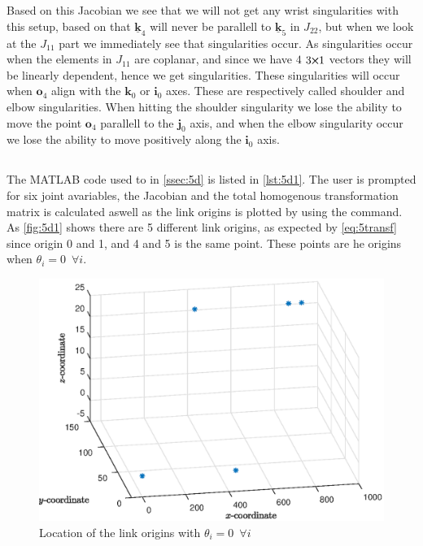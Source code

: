 \documentclass[a4paper]{scrartcl}
\begin{document}
Based on this Jacobian we see that we will not get any wrist singularities with this setup, based on that $\underline{\bm{k}}_4$ will never be parallell to $\underline{\bm{k}}_5$ in $J_{22}$, but when we look at the $J_{11}$ part we immediately see that singularities occur. As singularities occur when the elements in $J_{11}$ are coplanar, and since we have $4$ $3\!\!\cross\!\!1$ vectors they will be linearly dependent, hence we get singularities. These singularities will occur when $\bm{o}_4$ align with the $\bm{k}_0$ or $\bm{i}_0$ axes. These are respectively called shoulder and elbow singularities. When hitting the shoulder singularity we lose the ability to move the point $\bm{o}_4$ parallell to the $\bm{j}_0$ axis, and when the elbow singularity occur we lose the ability to move positively along the $\bm{i}_0$ axis.


\subsection{}\label{ssec:5d} %
The MATLAB code used to in \autoref{ssec:5d} is listed in \autoref{lst:5d1}. The user is prompted for six joint avariables, the Jacobian and the total homogenous transformation matrix is calculated aswell as the link origins is plotted by using the  command. As \autoref{fig:5d1} shows there are 5 different link origins, as expected by \eqref{eq:5transf} since origin 0 and 1, and 4 and 5 is the same point. These points are he origins when $\theta_i = 0 \enspace \forall i$.

\begin{figure}[ht!]
    \centering
    \includegraphics[width = .95\textwidth]{5d_new.eps}
    \caption{Location of the link origins with $\theta_i = 0 \enspace \forall i$}
    \label{fig:5d1}
\end{figure}
\end{document}
